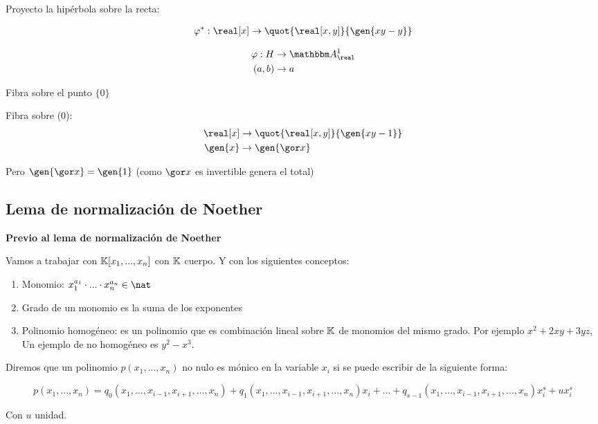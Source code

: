\begin{example}
	Proyecto la hipérbola sobre la recta:

	\begin{align*}
		\varphi^*: \real[x]& \rightarrow \quot{\real[x,y]}{\gen{xy-y}} \\
	\end{align*}

		\begin{align*}
			\varphi: H & \rightarrow \A^1_{\real} \\
			(a,b) & \rightarrow a
		\end{align*}

		Fibra sobre el punto $\{0\}$

		Fibra sobre (0):
		\begin{align*}
			\real[x]& \rightarrow \quot{\real[x,y]}{\gen{xy-1}} \\
			\gen{x} & \rightarrow \gen{\cls{x}}
		\end{align*}

		Pero $\gen{\cls{x}} = \gen{1}$ (como $\cls{x}$ es invertible genera el total)
\end{example}

\subsection{Lema de normalización de Noether}

\textbf{Previo al lema de normalización de Noether}

Vamos a trabajar con $\mathbb{K}[x_1,...,x_n]$ con $\mathbb{K}$ cuerpo. Y con los siguientes conceptos:
\begin{enumerate}
	\item Monomio: $x_1^{a_1}\cdot...\cdot x_n^{a_n} \in \nat$
	\item Grado de un monomio es la suma de los exponentes
	\item Polinomio homogéneo: es un polinomio que es combinación lineal sobre $\mathbb{K}$ de monomios del mismo grado.
	Por ejemplo $x^2+2xy+3yz$, Un ejemplo de no homogéneo es $y^2-x^3$.
\end{enumerate}

\begin{defn}
	Diremos que un polinomio $p(x_1,...,x_n)$ no nulo es mónico en la variable $x_i$ si se puede escribir de la siguiente forma:

	$$ p(x_1,...,x_n) = q_0(x_1,...,x_{i-1},x_{i+1},...,x_n)+q_1(x_1,...,x_{i-1},x_{i+1},...,x_n)x_i+...+q_{s-1}(x_1,...,x_{i-1},x_{i+1},...,x_n)x_i^s+ux_i^s $$

	Con $u$ unidad.
\end{defn}

